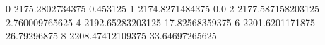 0 2175.2802734375 0.453125
1 2174.8271484375 0.0
2 2177.587158203125 2.760009765625
4 2192.65283203125 17.82568359375
6 2201.6201171875 26.79296875
8 2208.47412109375 33.64697265625
